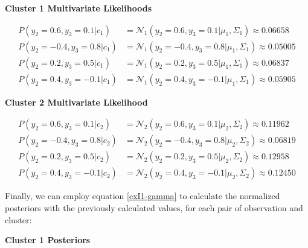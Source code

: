 \documentclass[12pt]{article}
\begin{document}
\begin{enumerate}[leftmargin=\labelsep]
        \begin{center}
          \textbf{\colorbox{bmint}{Cluster 1 Multivariate Likelihoods}}
        \end{center}

        \vskip -0.7cm
        \begingroup
        \addtolength{\jot}{0.5em}
        \begin{align*}
          P(y_2=0.6, y_3=0.1 | c_1)  & = \mathcal{N}_1(y_2=0.6, y_3=0.1|\mu_1, \Sigma_1) \approx 0.06658  \\
          P(y_2=-0.4, y_3=0.8 | c_1) & = \mathcal{N}_1(y_2=-0.4, y_3=0.8|\mu_1, \Sigma_1) \approx 0.05005 \\
          P(y_2=0.2, y_3=0.5 | c_1)  & = \mathcal{N}_1(y_2=0.2, y_3=0.5|\mu_1, \Sigma_1) \approx 0.06837  \\
          P(y_2=0.4, y_3=-0.1 | c_1) & = \mathcal{N}_1(y_2=0.4, y_3=-0.1|\mu_1, \Sigma_1) \approx 0.05905
        \end{align*}
        \endgroup

        \begin{center}
          \textbf{\colorbox{byellow}{Cluster 2 Multivariate Likelihood}}
        \end{center}

        \vskip -0.7cm
        \begingroup
        \addtolength{\jot}{0.7em}
        \begin{align*}
          P(y_2=0.6, y_3=0.1 | c_2)  & = \mathcal{N}_2(y_2=0.6, y_3=0.1|\mu_2, \Sigma_2) \approx 0.11962  \\
          P(y_2=-0.4, y_3=0.8 | c_2) & = \mathcal{N}_2(y_2=-0.4, y_3=0.8|\mu_2, \Sigma_2) \approx 0.06819 \\
          P(y_2=0.2, y_3=0.5 | c_2)  & = \mathcal{N}_2(y_2=0.2, y_3=0.5|\mu_2, \Sigma_2) \approx 0.12958  \\
          P(y_2=0.4, y_3=-0.1 | c_2) & = \mathcal{N}_2(y_2=0.4, y_3=-0.1|\mu_2, \Sigma_2) \approx 0.12450
        \end{align*}
        \endgroup

        \vskip 0.1cm
        Finally, we can employ equation \eqref{exI1-gamma} to calculate the normalized posteriors with the previously calculated values,
        for each pair of observation and cluster:

        \begin{center}
          \textbf{\colorbox{bmint}{Cluster 1 Posteriors}}
        \end{center}


\end{enumerate}
\end{document}
